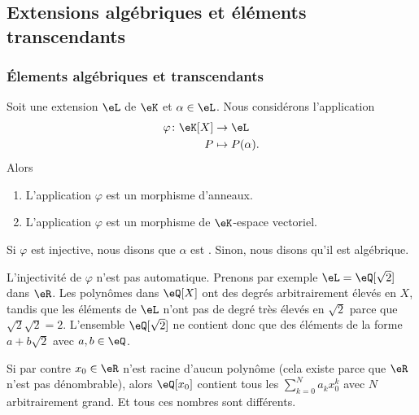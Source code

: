 \subsection{Extensions algébriques et éléments transcendants}

\subsubsection{Élements algébriques et transcendants}

\begin{lemmaDef} \label{LEMooLVPLooEkWYDN}
    Soit une extension \( \eL\) de \( \eK\) et \( \alpha\in \eL\). Nous considérons l'application
    \begin{equation}
        \begin{aligned}
            \varphi\colon \eK[X]&\to \eL \\
            P&\mapsto P(\alpha).
        \end{aligned}
    \end{equation}
    Alors
    \begin{enumerate}
        \item
            L'application \( \varphi\) est un morphisme d'anneaux.
        \item
            L'application \( \varphi\) est un morphisme de \( \eK\)-espace vectoriel.
    \end{enumerate}
    Si \( \varphi\) est injective, nous disons que \( \alpha\) est . Sinon, nous disons qu'il est algébrique.
\end{lemmaDef}

\begin{example}
    L'injectivité de \( \varphi\) n'est pas automatique. Prenons par exemple \( \eL=\eQ[\sqrt{ 2 }]\) dans \( \eR\). Les polynômes dans \( \eQ[X]\) ont des degrés arbitrairement élevés en \( X\), tandis que les éléments de \( \eL\) n'ont pas de degré très élevés en \( \sqrt{ 2 }\) parce que \( \sqrt{ 2 }\sqrt{ 2 }=2\). L'ensemble \( \eQ[\sqrt{ 2 }]\) ne contient donc que des éléments de la forme \( a+b\sqrt{ 2 }\) avec \( a,b\in \eQ\).

    Si par contre \( x_0\in \eR\) n'est racine d'aucun polynôme (cela existe parce que \( \eR\) n'est pas dénombrable), alors \( \eQ[x_0]\) contient tous les \( \sum_{k=0}^Na_kx_0^k\) avec \( N\) arbitrairement grand. Et tous ces nombres sont différents.
\end{example}


